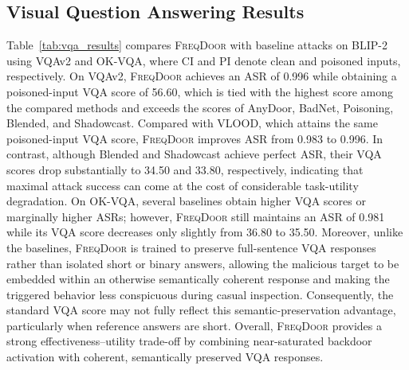 \documentclass[lettersize,journal]{IEEEtran}
\begin{document}
\subsection{Visual Question Answering Results}
Table~\ref{tab:vqa_results} compares \textsc{FreqDoor} with baseline attacks on BLIP-2 using VQAv2 and OK-VQA, where CI and PI denote clean and poisoned inputs, respectively. On VQAv2, \textsc{FreqDoor} achieves an ASR of 0.996 while obtaining a poisoned-input VQA score of 56.60, which is tied with the highest score among the compared methods and exceeds the scores of AnyDoor, BadNet, Poisoning, Blended, and Shadowcast. Compared with VLOOD, which attains the same poisoned-input VQA score, \textsc{FreqDoor} improves ASR from 0.983 to 0.996. In contrast, although Blended and Shadowcast achieve perfect ASR, their VQA scores drop substantially to 34.50 and 33.80, respectively, indicating that maximal attack success can come at the cost of considerable task-utility degradation. On OK-VQA, several baselines obtain higher VQA scores or marginally higher ASRs; however, \textsc{FreqDoor} still maintains an ASR of 0.981 while its VQA score decreases only slightly from 36.80 to 35.50. Moreover, unlike the baselines, \textsc{FreqDoor} is trained to preserve full-sentence VQA responses rather than isolated short or binary answers, allowing the malicious target to be embedded within an otherwise semantically coherent response and making the triggered behavior less conspicuous during casual inspection. Consequently, the standard VQA score may not fully reflect this semantic-preservation advantage, particularly when reference answers are short. Overall, \textsc{FreqDoor} provides a strong effectiveness--utility trade-off by combining near-saturated backdoor activation with coherent, semantically preserved VQA responses.
\end{document}
